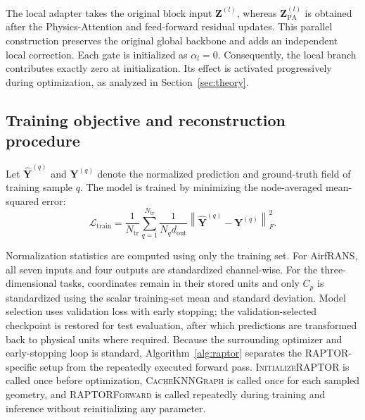 \documentclass[a4paper,fleqn]{cas-sc}
\begin{document}
The local adapter takes the original block input \(\mathbf{Z}^{(l)}\), whereas \(\mathbf{Z}_{\mathrm{PA}}^{(l)}\) is obtained after the Physics-Attention and feed-forward residual updates. This parallel construction preserves
the original global backbone and adds an independent local correction. Each gate is initialized as \(\alpha_l=0\). Consequently, the local branch contributes exactly zero at initialization. Its effect is activated progressively during optimization, as analyzed in Section~\ref{sec:theory}.

\subsection{Training objective and reconstruction procedure}
\label{subsec:training}
Let \(\widehat{\mathbf{Y}}^{(q)}\) and \(\mathbf{Y}^{(q)}\) denote the normalized prediction and ground-truth field of training sample \(q\). The model is trained by minimizing the node-averaged mean-squared error:
\begin{equation}
    \mathcal{L}_{\mathrm{train}}
    =
    \frac{1}{N_{\mathrm{tr}}}
    \sum_{q=1}^{N_{\mathrm{tr}}}
    \frac{1}{N_qd_{\mathrm{out}}}
    \left\|
        \widehat{\mathbf{Y}}^{(q)}
        -
        \mathbf{Y}^{(q)}
    \right\|_{F}^{2}.
    \label{eq:training_loss}
\end{equation}

Normalization statistics are computed using only the training set. For AirfRANS, all seven inputs and four outputs are standardized channel-wise. For the three-dimensional tasks, coordinates remain in their stored units and only \(C_p\) is standardized using the scalar training-set mean and standard deviation. Model selection uses validation loss with early stopping; the validation-selected checkpoint is restored for test evaluation, after which predictions are transformed back to physical units where required. Because the surrounding optimizer and early-stopping loop is standard, Algorithm~\ref{alg:raptor} separates the RAPTOR-specific setup from the repeatedly executed forward pass. \textsc{InitializeRAPTOR} is called once before optimization, \textsc{CacheKNNGraph} is called once for each sampled geometry, and \textsc{RAPTORForward} is called repeatedly during training and inference without reinitializing any parameter.
\end{document}
